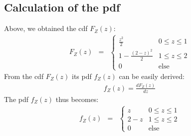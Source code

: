 \documentclass[12pt]{article}
\theoremstyle{definition}
\theoremstyle{remark}
\begin{document}
\subsection*{Calculation of the pdf}
Above, we obtained the cdf $F_Z(z)$: 
\begin{eqnarray}
     F_Z(z) &= & \begin{cases}
                     \frac{z^2}{2} & 0 \le z \le 1 \nonumber \\
		     1 - \frac{(2-z)^2}{2} & 1 \le z \le 2 \nonumber \\
		     0   & \text{else} \nonumber
	         \end{cases}
\end{eqnarray}
From the cdf $F_Z(z)$ its pdf $f_Z(z)$ can be easily derived: 
\begin{eqnarray}
    f_Z(z) = \frac{d F_Z(z)}{dz} \nonumber
\end{eqnarray}	
The pdf $f_Z(z)$ thus becomes:
\begin{eqnarray}
     f_Z(z) &= & \begin{cases}
                     z   & 0 \le z \le 1 \nonumber \\
                     2-z & 1 \le z \le 2 \nonumber \\
                     0   & \text{else} \nonumber
                 \end{cases}
\end{eqnarray}
\end{document}
